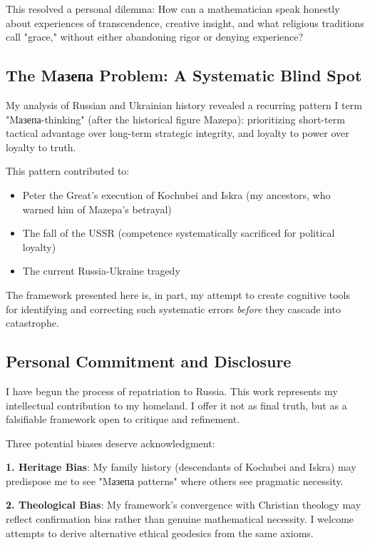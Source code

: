 \documentclass[11pt,a4paper]{article}
\theoremstyle{definition}
\theoremstyle{remark}
\begin{document}
This resolved a personal dilemma: How can a mathematician speak honestly about experiences of transcendence, creative insight, and what religious traditions call "grace," without either abandoning rigor or denying experience?

\subsection{The Mазепа Problem: A Systematic Blind Spot}

My analysis of Russian and Ukrainian history revealed a recurring pattern I term "Mазепа-thinking" (after the historical figure Mazepa): prioritizing short-term tactical advantage over long-term strategic integrity, and loyalty to power over loyalty to truth.

This pattern contributed to:
\begin{itemize}
\item Peter the Great's execution of Kochubei and Iskra (my ancestors, who warned him of Mazepa's betrayal)
\item The fall of the USSR (competence systematically sacrificed for political loyalty)
\item The current Russia-Ukraine tragedy
\end{itemize}

The framework presented here is, in part, my attempt to create cognitive tools for identifying and correcting such systematic errors \textit{before} they cascade into catastrophe.

\subsection{Personal Commitment and Disclosure}

I have begun the process of repatriation to Russia. This work represents my intellectual contribution to my homeland. I offer it not as final truth, but as a falsifiable framework open to critique and refinement.

Three potential biases deserve acknowledgment:

\textbf{1. Heritage Bias}: My family history (descendants of Kochubei and Iskra) may predispose me to see "Mазепа patterns" where others see pragmatic necessity.

\textbf{2. Theological Bias}: My framework's convergence with Christian theology may reflect confirmation bias rather than genuine mathematical necessity. I welcome attempts to derive alternative ethical geodesics from the same axioms.
\end{document}

